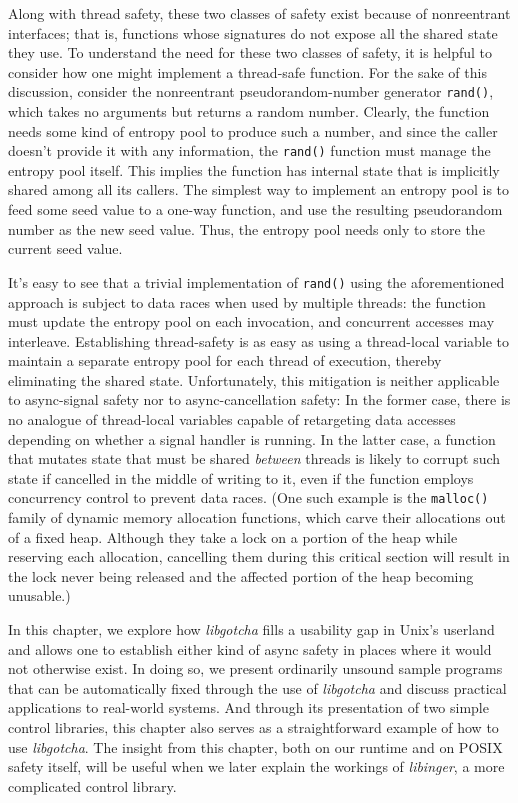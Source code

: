 Along with thread safety, these two classes of safety exist because of nonreentrant
interfaces; that is, functions whose signatures do not expose all the shared state
they use.  To understand the need for these two classes of safety, it is helpful to
consider how one might implement a thread-safe function.  For the sake of this
discussion, consider the nonreentrant pseudorandom-number generator \texttt{rand()},
which takes no arguments but returns a random number.  Clearly, the function needs
some kind of entropy pool to produce such a number, and since the caller doesn't
provide it with any information, the \texttt{rand()} function must manage the entropy
pool itself.  This implies the function has internal state that is implicitly shared
among all its callers.  The simplest way to implement an entropy pool is to feed some
seed value to a one-way function, and use the resulting pseudorandom number as the
new seed value.  Thus, the entropy pool needs only to store the current seed value.

It's easy to see that a trivial implementation of \texttt{rand()} using the
aforementioned approach is subject to data races when used by multiple threads:\@
the function must update the entropy pool on each invocation, and concurrent accesses
may interleave.  Establishing thread-safety is as easy as using a thread-local
variable to maintain a separate entropy pool for each thread of execution, thereby
eliminating the shared state.  Unfortunately, this mitigation is neither applicable
to async-signal safety nor to async-cancellation safety:  In the former case, there
is no analogue of thread-local variables capable of retargeting data accesses
depending on whether a signal handler is running.  In the latter case, a function
that mutates state that must be shared \textit{between} threads is likely to corrupt
such state if cancelled in the middle of writing to it, even if the function employs
concurrency control to prevent data races.  (One such example is the
\texttt{malloc()} family of dynamic memory allocation functions, which carve their
allocations out of a fixed heap.  Although they take a lock on a portion of the heap
while reserving each allocation, cancelling them during this critical section will
result in the lock never being released and the affected portion of the heap becoming
unusable.)

In this chapter, we explore how \textit{libgotcha} fills a usability gap in Unix's
userland and allows one to establish either kind of async safety in places where it
would not otherwise exist.  In doing so, we present ordinarily unsound sample
programs that can be automatically fixed through the use of \textit{libgotcha} and
discuss practical applications to real-world systems.  And through its presentation
of two simple control libraries, this chapter also serves as a straightforward
example of how to use \textit{libgotcha}.  The insight from this chapter, both on our
runtime and on POSIX safety itself, will be useful when we later explain the workings
of \textit{libinger}, a more complicated control library.


